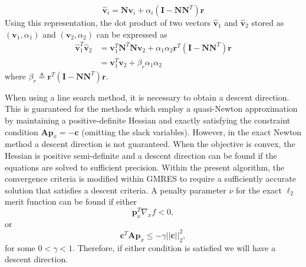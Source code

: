 \documentclass[12pt]{article}
\newcommand{\mb}{\mathbf}
\begin{document}
%
\begin{equation*}
  \hat{\mb{v}}_{i} = \mb{N}\mb{v}_{i} + \alpha_{i} (\mb{I} - \mb{N}\mb{N}^{T})\mb{r}
\end{equation*}
Using this representation, the dot product of two vectors $\hat{\mb{v}}_{1}$ and $\hat{\mb{v}}_{2}$ stored as $(\mb{v}_{1}, \alpha_{1})$ and $(\mb{v}_{2}, \alpha_{2})$ can be expressed as
%
\begin{equation*}
  \begin{aligned}
    \hat{\mb{v}}_{1}^{T}\hat{\mb{v}}_{2} & = 
    \mb{v}_{1}^{T} \mb{N}^{T}\mb{N}\mb{v}_{2} + 
    \alpha_{1}\alpha_{2} \mb{r}^{T} \left(\mb{I} - \mb{N} \mb{N}^{T}\right)\mb{r} \\
      &= \mb{v}_{1}^{T} \mb{v}_{2} + \beta_{r} \alpha_{1}\alpha_{2}
  \end{aligned}
\end{equation*}
where $\beta_{r} \triangleq \mb{r}^{T} \left(\mb{I} - \mb{N} \mb{N}^{T}\right)\mb{r}$.

When using a line search method, it is necessary to obtain a descent direction.
This is guaranteed for the methods which employ a quasi-Newton approximation by maintaining a positive-definite Hessian and exactly satisfying the constraint condition $\mb{A}\mb{p}_{x} = -\mb{c}$ (omitting the slack variables).
However, in the exact Newton method a descent direction is not guaranteed.
When the objective is convex, the Hessian is positive semi-definite and a descent direction can be found if the equations are solved to sufficient precision. 
Within the present algorithm, the convergence criteria is modified within GMRES to require a sufficiently accurate solution that satisfies a descent criteria.
A penalty parameter $\nu$ for the exact $\ell_{2}$ merit function can be found if either 
\begin{equation}
  \label{eqn:descent-function}
  \mb{p}_{x}^{T} \nabla_{x} f < 0,
\end{equation}
or 
\begin{equation}
  \label{eqn:descent-constraint}
  \mb{c}^{T}\mb{A} \mb{p}_{x} \le - \gamma ||\mb{c}||_{2}^2,
\end{equation}
for some $0 < \gamma < 1$.
Therefore, if either condition is satisfied we will have a descent direction.
\end{document}
